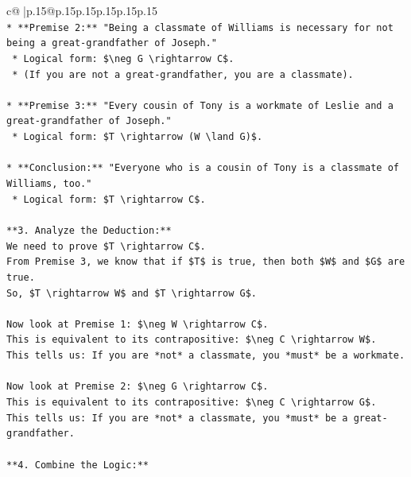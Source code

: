 \documentclass{article}
\begin{document}
{\begin{supertabular}{c@{$\;$}|p{.15\linewidth}@{}p{.15\linewidth}p{.15\linewidth}p{.15\linewidth}p{.15\linewidth}p{.15\linewidth}}
{{{\\ 
\texttt{*   **Premise 2:** "Being a classmate of Williams is necessary for not being a great{-}grandfather of Joseph."} \\
\texttt{    *   Logical form: \$\textbackslash{}neg G \textbackslash{}rightarrow C\$.} \\
\texttt{    *   (If you are not a great{-}grandfather, you are a classmate).} \\
\\ 
\texttt{*   **Premise 3:** "Every cousin of Tony is a workmate of Leslie and a great{-}grandfather of Joseph."} \\
\texttt{    *   Logical form: \$T \textbackslash{}rightarrow (W \textbackslash{}land G)\$.} \\
\\ 
\texttt{*   **Conclusion:** "Everyone who is a cousin of Tony is a classmate of Williams, too."} \\
\texttt{    *   Logical form: \$T \textbackslash{}rightarrow C\$.} \\
\\ 
\texttt{**3. Analyze the Deduction:**} \\
\texttt{We need to prove \$T \textbackslash{}rightarrow C\$.} \\
\texttt{From Premise 3, we know that if \$T\$ is true, then both \$W\$ and \$G\$ are true.} \\
\texttt{So, \$T \textbackslash{}rightarrow W\$ and \$T \textbackslash{}rightarrow G\$.} \\
\\ 
\texttt{Now look at Premise 1: \$\textbackslash{}neg W \textbackslash{}rightarrow C\$.} \\
\texttt{This is equivalent to its contrapositive: \$\textbackslash{}neg C \textbackslash{}rightarrow W\$.} \\
\texttt{This tells us: If you are *not* a classmate, you *must* be a workmate.} \\
\\ 
\texttt{Now look at Premise 2: \$\textbackslash{}neg G \textbackslash{}rightarrow C\$.} \\
\texttt{This is equivalent to its contrapositive: \$\textbackslash{}neg C \textbackslash{}rightarrow G\$.} \\
\texttt{This tells us: If you are *not* a classmate, you *must* be a great{-}grandfather.} \\
\\ 
\texttt{**4. Combine the Logic:**} \\
}}}
\end{supertabular}}
\end{document}
